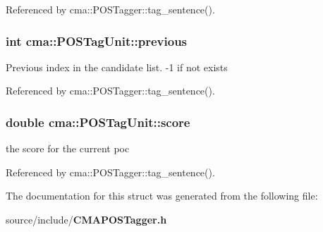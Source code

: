 Referenced by cma::POSTagger::tag\_\-sentence().
\subsubsection[{previous}]{\setlength{\rightskip}{0pt plus 5cm}int {\bf cma::POSTagUnit::previous}}\label{structcma_1_1POSTagUnit_f11c0faeb5fb6c58348768403a9714a9}


Previous index in the candidate list. -1 if not exists 

Referenced by cma::POSTagger::tag\_\-sentence().
\subsubsection[{score}]{\setlength{\rightskip}{0pt plus 5cm}double {\bf cma::POSTagUnit::score}}\label{structcma_1_1POSTagUnit_8256b2cd6fab35e40cc1bc2dd3b39ce2}


the score for the current poc 

Referenced by cma::POSTagger::tag\_\-sentence().

The documentation for this struct was generated from the following file:\begin{CompactItemize}
\item 
source/include/{\bf CMAPOSTagger.h}\end{CompactItemize}

